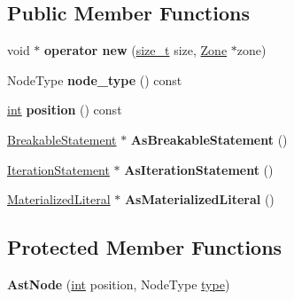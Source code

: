 \subsection*{Public Member Functions}
\begin{DoxyCompactItemize}
\item 
\mbox{\label{classv8_1_1internal_1_1AstNode_a3b42cf9e8f0c9685573ab0f445d30856}} 
void $\ast$ {\bfseries operator new} (\mbox{\hyperlink{classsize__t}{size\+\_\+t}} size, \mbox{\hyperlink{classv8_1_1internal_1_1Zone}{Zone}} $\ast$zone)
\item 
\mbox{\label{classv8_1_1internal_1_1AstNode_ad2383a08814cf53a35738fe3d84c5e3b}} 
Node\+Type {\bfseries node\+\_\+type} () const
\item 
\mbox{\label{classv8_1_1internal_1_1AstNode_a9fcfa53b12eb954e0f72f17465ade813}} 
\mbox{\hyperlink{classint}{int}} {\bfseries position} () const
\item 
\mbox{\label{classv8_1_1internal_1_1AstNode_ace8690f07ae06be7a8adf693046e4334}} 
\mbox{\hyperlink{classv8_1_1internal_1_1BreakableStatement}{Breakable\+Statement}} $\ast$ {\bfseries As\+Breakable\+Statement} ()
\item 
\mbox{\label{classv8_1_1internal_1_1AstNode_ae3e25fa09ab1bdec48d69d0a03ab266a}} 
\mbox{\hyperlink{classv8_1_1internal_1_1IterationStatement}{Iteration\+Statement}} $\ast$ {\bfseries As\+Iteration\+Statement} ()
\item 
\mbox{\label{classv8_1_1internal_1_1AstNode_a81215882e963669f78e868d42d131946}} 
\mbox{\hyperlink{classv8_1_1internal_1_1MaterializedLiteral}{Materialized\+Literal}} $\ast$ {\bfseries As\+Materialized\+Literal} ()
\end{DoxyCompactItemize}
\subsection*{Protected Member Functions}
\begin{DoxyCompactItemize}
\item 
\mbox{\label{classv8_1_1internal_1_1AstNode_a252506cc4179b3bc7ffe07b18d52ffea}} 
{\bfseries Ast\+Node} (\mbox{\hyperlink{classint}{int}} position, Node\+Type \mbox{\hyperlink{classstd_1_1conditional_1_1type}{type}})
\end{DoxyCompactItemize}
